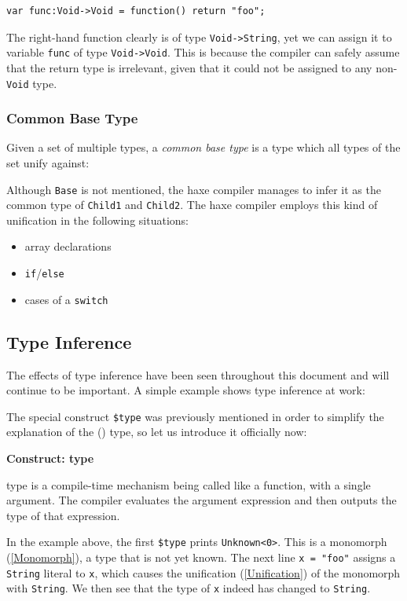 \documentclass{article}
\newcommand{\type}[1]{\texttt{#1}}
\newcommand{\expr}[1]{\texttt{#1}}
\newenvironment{myshaded}
  {\def\FrameCommand{\fboxsep=\topsep\colorbox{bgcolor}}%
  \MakeFramed {\advance\hsize-\width \FrameRestore}}%
 {\endMakeFramed}
\newcommand{\define}[3][Definition]
	{\begin{myshaded}\noindent\textbf{#1: #2}\par\nobreak\noindent\ignorespaces#3\label{def:#2}\end{myshaded}}
\newcommand{\Fullref}[1]{\nameref{#1} (\Cref{#1})}
\newcommand{\tref}[2]{#1 (\ref{#2})}
\begin{document}
\begin{lstlisting}
var func:Void->Void = function() return "foo";
\end{lstlisting}
The right-hand function clearly is of type \type{Void->String}, yet we can assign it to variable \expr{func} of type \type{Void->Void}. This is because the compiler can safely assume that the return type is irrelevant, given that it could not be assigned to any non-\type{Void} type.


\subsubsection{Common Base Type}
\label{Common Base Type}

Given a set of multiple types, a \emph{common base type} is a type which all types of the set unify against:


Although \type{Base} is not mentioned, the haxe compiler manages to infer it as the common type of \type{Child1} and \type{Child2}. The haxe compiler employs this kind of unification in the following situations:

\begin{itemize}
	\item array declarations
	\item \expr{if}/\expr{else}
	\item cases of a \expr{switch}
\end{itemize}




\subsection{Type Inference}
\label{Type Inference}

The effects of type inference have been seen throughout this document and will continue to be important. A simple example shows type inference at work:


The special construct \expr{\$type} was previously mentioned in order to simplify the explanation of the \Fullref{Function} type, so let us introduce it officially now:

\define[Construct]{type}{type is a compile-time mechanism being called like a function, with a single argument. The compiler evaluates the argument expression and then outputs the type of that expression.}

In the example above, the first \expr{\$type} prints \expr{Unknown<0>}. This is a \tref{monomorph}{Monomorph}, a type that is not yet known. The next line \expr{x = "foo"} assigns a \type{String} literal to \expr{x}, which causes the \tref{unification}{Unification} of the monomorph with \type{String}. We then see that the type of \expr{x} indeed has changed to \type{String}.
\end{document}
